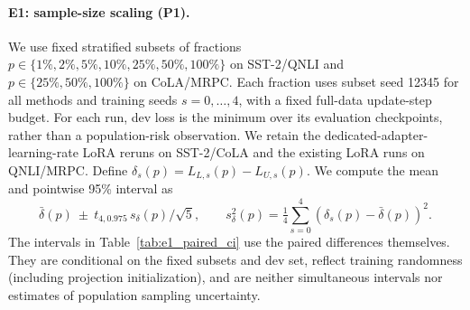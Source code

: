 \begin{table}[t]
\centering
\small
\caption{Real-model tests of the theoretical mechanism. E1 probes the sample-size signature in Eq.~\eqref{eq:risk_gap_n}; E3 decomposes predictive variability and a reference-based bias proxy; E5 diagnoses coordinate concentration related to the recoverability condition underlying Proposition~\ref{prop:matched_budget}.}
\label{tab:pred_overview}
\end{table}

\paragraph{E1: sample-size scaling (P1).}
We use fixed stratified subsets of fractions $p\in\{1\%,2\%,5\%,10\%,25\%,50\%,100\%\}$ on SST-2/QNLI and $p\in\{25\%,50\%,100\%\}$ on CoLA/MRPC. Each fraction uses subset seed 12345 for all methods and training seeds $s=0,\ldots,4$, with a fixed full-data update-step budget. For each run, dev loss is the minimum over its evaluation checkpoints, rather than a population-risk observation. We retain the dedicated-adapter-learning-rate LoRA reruns on SST-2/CoLA and the existing LoRA runs on QNLI/MRPC.
Define $\delta_s(p)=L_{L,s}(p)-L_{U,s}(p)$. We compute the mean and pointwise 95\% interval as
\begin{equation}
 \bar\delta(p)\ \pm\ t_{4,0.975}\,s_\delta(p)/\sqrt{5},
 \qquad s_\delta^2(p)=\tfrac14\sum_{s=0}^4(\delta_s(p)-\bar\delta(p))^2.
\end{equation}
The intervals in Table~\ref{tab:e1_paired_ci} use the paired differences themselves. They are conditional on the fixed subsets and dev set, reflect training randomness (including projection initialization), and are neither simultaneous intervals nor estimates of population sampling uncertainty.

